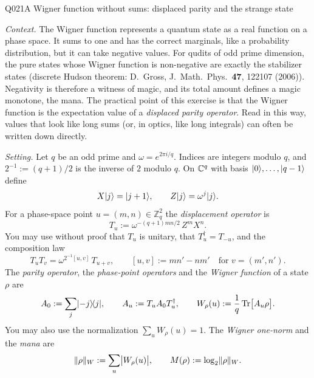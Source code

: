 \begin{entry}{Q021}{A Wigner function without sums: displaced parity and the strange state}


\begin{problem}
\emph{Context.} The Wigner function represents a quantum state as a real function on a
phase space. It sums to one and has the correct marginals, like a probability
distribution, but it can take negative values. For qudits of odd prime dimension, the
pure states whose Wigner function is non-negative are exactly the stabilizer states
(discrete Hudson theorem: D.~Gross, J.~Math.~Phys.~\textbf{47}, 122107 (2006)). Negativity
is therefore a witness of magic, and its total amount defines a magic monotone, the mana.
The practical point of this exercise is that the Wigner function is the expectation value
of a \emph{displaced parity operator}. Read in this way, values that look like long sums
(or, in optics, like long integrals) can often be written down directly.

\emph{Setting.} Let $q$ be an odd prime and $\omega=e^{2\pi i/q}$. Indices are integers
modulo $q$, and $2^{-1}:=(q+1)/2$ is the inverse of $2$ modulo $q$. On $\mathbb{C}^q$ with basis
$\lvert 0 \rangle,\dots,\lvert q-1 \rangle$ define
\[
  X\lvert j \rangle=\lvert j+1 \rangle,\qquad Z\lvert j \rangle=\omega^{j}\lvert j \rangle .
\]
For a phase-space point $u=(m,n)\in\mathbb{Z}_q^2$ the \emph{displacement operator} is
\[
  T_u := \omega^{-(q+1)mn/2}\,Z^{m}X^{n}.
\]
You may use without proof that $T_u$ is unitary, that $T_u^{\dagger}=T_{-u}$, and the
composition law
\[
  T_uT_v=\omega^{2^{-1}[u,v]}\,T_{u+v},\qquad [u,v]:=mn'-nm' \quad\text{for } v=(m',n').
\]
The \emph{parity operator}, the \emph{phase-point operators} and the \emph{Wigner
function} of a state $\rho$ are
\[
  A_0:=\sum_{j}\lvert -j \rangle\!\langle j \rvert,\qquad
  A_u:=T_uA_0T_u^{\dagger},\qquad
  W_\rho(u):=\frac1q\operatorname{Tr}\bigl[A_u\rho\bigr].
\]
You may also use the normalization $\sum_u W_\rho(u)=1$. The \emph{Wigner one-norm} and the
\emph{mana} are
\[
  \lVert\rho\rVert_W:=\sum_u\bigl|W_\rho(u)\bigr|,\qquad M(\rho):=\log_2\lVert\rho\rVert_W .
\]


\end{problem}
\end{entry}

